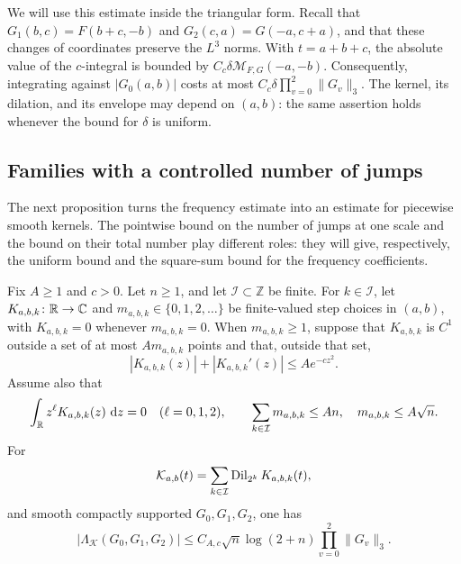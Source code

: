 We will use this estimate inside the triangular form.  Recall that
$G_1(b,c)=F(b+c,-b)$ and $G_2(c,a)=G(-a,c+a)$, and that these changes
of coordinates preserve the $L^3$ norms.  With $t=a+b+c$, the absolute
value of the $c$-integral is bounded by
$C_c\delta\mathcal M_{F,G}(-a,-b)$.
Consequently, integrating against $|G_0(a,b)|$ costs at most
$C_c\delta\prod_{v=0}^2\|G_v\|_3$.
The kernel, its dilation, and its envelope may depend on $(a,b)$:
the same assertion holds whenever the bound for $\delta$ is uniform.

\subsection{Families with a controlled number of jumps}

The next proposition turns the frequency estimate into an estimate for
piecewise smooth kernels.  The pointwise bound on the number of jumps
at one scale and the bound on their total number play different roles:
they will give, respectively, the uniform bound and the square-sum
bound for the frequency coefficients.

\begin{proposition}
\label{prop:rough-family}
Fix $A\ge1$ and $c>0$.  Let $n\ge1$, and let $\mathcal I\subset\mathbb Z$
be finite.  For $k\in\mathcal I$, let $K_{a,b,k}\colon\mathbb R\to\mathbb C$ and
$m_{a,b,k}\in\{0,1,2,\ldots\}$ be finite-valued step choices in
$(a,b)$, with $K_{a,b,k}=0$ whenever $m_{a,b,k}=0$.
When $m_{a,b,k}\ge1$, suppose that $K_{a,b,k}$ is $C^1$ outside a set
of at most $A m_{a,b,k}$ points and that, outside that set,
\begin{equation}
 |K_{a,b,k}(z)|+|K_{a,b,k}'(z)|\le A e^{-cz^2}.
 \label{eq:rough-family-decay}
\end{equation}
Assume also that
\begin{equation}
 \int_{\mathbb R}z^\ell K_{a,b,k}(z)\,\,\mathrm d z=0
 \quad(\ell=0,1,2),
 \qquad
 \sum_{k\in\mathcal I}m_{a,b,k}\le An,
 \quad m_{a,b,k}\le A\sqrt n.
 \label{eq:rough-family-hypotheses}
\end{equation}
For
\[
 \mathcal K_{a,b}(t)
 =\sum_{k\in\mathcal I}\operatorname{Dil}_{2^k}K_{a,b,k}(t),
\]
and smooth compactly supported $G_0,G_1,G_2$, one has
\begin{equation}
 |\Lambda_{\mathcal K}(G_0,G_1,G_2)|
 \le C_{A,c}\sqrt n\log(2+n)\prod_{v=0}^2\|G_v\|_3.
 \label{eq:rough-family-bound}
\end{equation}
\end{proposition}

